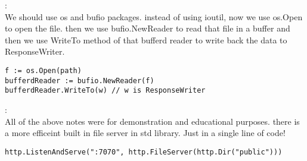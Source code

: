 \begin{note}:\\
We should use os and bufio packages. instead of using ioutil, now we use os.Open to open the file. then we use bufio.NewReader to read that file in a buffer and then we use WriteTo method of that bufferd reader to write back the data to ResponseWriter.
\begin{lstlisting}[language=Golang]
f := os.Open(path)
bufferdReader := bufio.NewReader(f)
bufferdReader.WriteTo(w) // w is ResponseWriter
\end{lstlisting}
\end{note}
\begin{note}:\\
All of the above notes were for demonstration and educational purposes. there is a more efficeint built in file server in std library. Just in a single line of code!
\begin{lstlisting}[language=Golang]
http.ListenAndServe(":7070", http.FileServer(http.Dir("public")))
\end{lstlisting}
\end{note}
